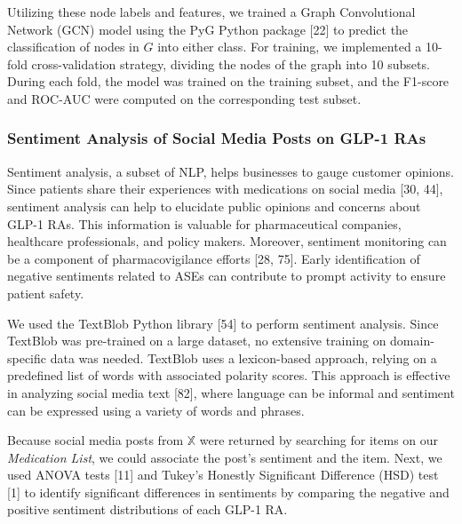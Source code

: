 \documentclass[referee,bst/sn-basic]{sn-jnl}%
\begin{document}
Utilizing these node labels and features, we trained a Graph Convolutional Network (GCN) model using the PyG Python package [22] 
to predict the classification of nodes in $G$ into either class.
For training, we implemented a 10-fold cross-validation strategy, dividing the nodes of the graph into 10 subsets. 
During each fold, the model was trained on the training subset, and the F1-score and ROC-AUC were computed on the corresponding test subset.


\subsubsection{Sentiment Analysis of Social Media Posts on GLP-1 RAs}
\label{sec:sentiment}
Sentiment analysis, a subset of NLP, helps businesses to gauge customer opinions. 
Since patients share their experiences with medications on social media [30, 44], %
sentiment analysis can help to elucidate public opinions and concerns about GLP-1 RAs.
This information is valuable for pharmaceutical companies, healthcare professionals, and policy makers. 
Moreover, sentiment monitoring can be a component of pharmacovigilance efforts [28, 75]. 
Early identification of negative sentiments related to ASEs can contribute to prompt activity to ensure patient safety.

We used the TextBlob Python library [54] 
to perform sentiment analysis.
Since TextBlob was pre-trained on a large dataset, no extensive training on domain-specific data was needed.
TextBlob uses a lexicon-based approach, relying on a predefined list of words with associated polarity scores. 
This approach is effective in analyzing social media text [82], 
where language can be informal and sentiment can be expressed using a variety of words and phrases.

Because social media posts from $\mathbb{X}$ were returned by searching for items on our \textit{Medication List}, we could associate the post's sentiment and the item.
Next, we used ANOVA tests [11] 
and Tukey's Honestly Significant Difference (HSD) test [1] 
to identify significant differences in sentiments by comparing the negative and positive sentiment distributions of each GLP-1 RA.
\end{document}
